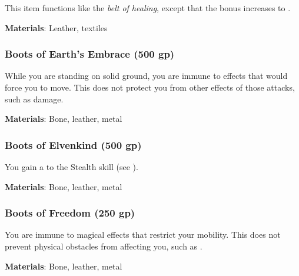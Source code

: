 This item functions like the \textit{belt of healing}, except that the bonus increases to .



\vspace{0.25em}
\textbf{Materials}: Leather, textiles


\lowercase{\hypertarget{item:Boots of Earth's Embrace}{}}\label{item:Boots of Earth's Embrace}
\hypertarget{item:Boots of Earth's Embrace}{\subsubsection{Boots of Earth's Embrace\hfill{} (500 gp)}}

While you are standing on solid ground, you are immune to effects that would force you to move.
This does not protect you from other effects of those attacks, such as damage.



\vspace{0.25em}
\textbf{Materials}: Bone, leather, metal


\lowercase{\hypertarget{item:Boots of Elvenkind}{}}\label{item:Boots of Elvenkind}
\hypertarget{item:Boots of Elvenkind}{\subsubsection{Boots of Elvenkind\hfill{} (500 gp)}}

You gain a   to the Stealth skill (see ).



\vspace{0.25em}
\textbf{Materials}: Bone, leather, metal


\lowercase{\hypertarget{item:Boots of Freedom}{}}\label{item:Boots of Freedom}
\hypertarget{item:Boots of Freedom}{\subsubsection{Boots of Freedom\hfill{} (250 gp)}}

You are immune to magical effects that restrict your mobility.
This does not prevent physical obstacles from affecting you, such as .



\vspace{0.25em}
\textbf{Materials}: Bone, leather, metal


